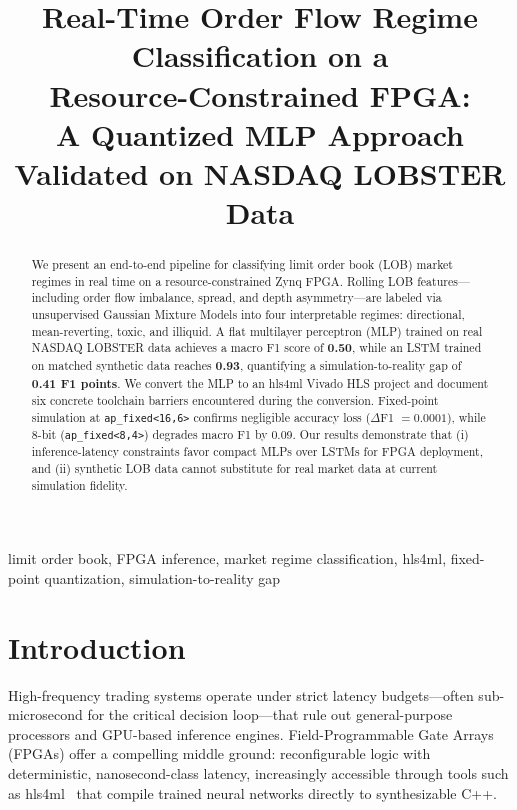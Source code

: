 \documentclass[conference]{IEEEtran}
\begin{document}
\title{Real-Time Order Flow Regime Classification on a\\
Resource-Constrained FPGA:\\
A Quantized MLP Approach Validated on NASDAQ LOBSTER Data}

\maketitle

\begin{abstract}
We present an end-to-end pipeline for classifying limit order book (LOB)
market regimes in real time on a resource-constrained Zynq FPGA.
Rolling LOB features—including order flow imbalance, spread, and depth
asymmetry—are labeled via unsupervised Gaussian Mixture Models into four
interpretable regimes: directional, mean-reverting, toxic, and illiquid.
A flat multilayer perceptron (MLP) trained on real NASDAQ LOBSTER data achieves
a macro F1 score of \textbf{0.50}, while an LSTM trained on matched synthetic
data reaches \textbf{0.93}, quantifying a simulation-to-reality gap of \textbf{0.41 F1 points}.
We convert the MLP to an hls4ml Vivado HLS project and document six
concrete toolchain barriers encountered during the conversion.
Fixed-point simulation at \texttt{ap\_fixed<16,6>} confirms negligible accuracy loss
($\Delta$F1 $= 0.0001$), while 8-bit (\texttt{ap\_fixed<8,4>}) degrades macro F1 by 0.09.
Our results demonstrate that (i) inference-latency constraints favor compact MLPs
over LSTMs for FPGA deployment, and (ii) synthetic LOB data cannot substitute
for real market data at current simulation fidelity.
\end{abstract}

\begin{IEEEkeywords}
limit order book, FPGA inference, market regime classification, hls4ml,
fixed-point quantization, simulation-to-reality gap
\end{IEEEkeywords}


\section{Introduction}
\label{sec:intro}

High-frequency trading systems operate under strict latency budgets—often
sub-microsecond for the critical decision loop—that rule out general-purpose
processors and GPU-based inference engines. Field-Programmable Gate Arrays (FPGAs)
offer a compelling middle ground: reconfigurable logic with deterministic,
nanosecond-class latency, increasingly accessible through tools such as
hls4ml~\cite{duarte2018fast} that compile trained neural networks directly to
synthesizable C++.
\end{document}
